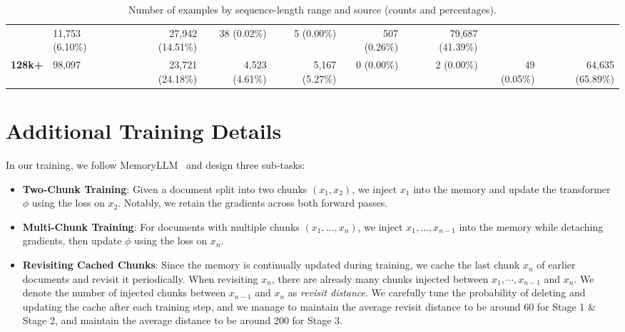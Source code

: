 \begin{table}[htbp]
{\begin{tabular}{llrrrrrrr}
                  & 11{,}753 (6.10\%) 
                  & 27{,}942 (14.51\%) 
                  & 38 (0.02\%) 
                  & 5 (0.00\%) 
                  & 507 (0.26\%) 
                  & 79{,}687 (41.39\%) \\
\textbf{128k+}    & 98{,}097 
                  & 23{,}721 (24.18\%) 
                  & 4{,}523 (4.61\%) 
                  & 5{,}167 (5.27\%) 
                  & 0 (0.00\%) 
                  & 2 (0.00\%) 
                  & 49 (0.05\%) 
                  & 64{,}635 (65.89\%) \\
\bottomrule
\end{tabular}}
\caption{Number of examples by sequence-length range and source (counts and percentages).}
\label{tab:sequence-ranges}
\end{table}


\section{Additional Training Details}
\label{sub:details_of_training_sub_tasks}
In our training, we follow MemoryLLM~\citep{memoryllm} and design three sub-tasks:
\begin{itemize}
    \item \textbf{Two-Chunk Training}: Given a document split into two chunks $(x_1, x_2)$, we inject $x_1$ into the memory and update the transformer $\phi$ using the loss on $x_2$. Notably, we retain the gradients across both forward passes. 
    \item \textbf{Multi-Chunk Training}: For documents with multiple chunks $(x_1, \dots, x_n)$, we inject $x_1, \dots, x_{n-1}$ into the memory while detaching gradients, then update $\phi$ using the loss on $x_n$.
    \item  \textbf{Revisiting Cached Chunks}: Since the memory is continually updated during training, we cache the last chunk $x_n$ of earlier documents and revisit it periodically. When revisiting $x_n$, there are already many chunks injected between $x_1, \cdots, x_{n-1}$ and $x_n$. We denote the number of injected chunks between $x_{n-1}$ and $x_n$ as \emph{revisit distance}. We carefully tune the probability of deleting and updating the cache after each training step, and we manage to maintain the average revisit distance to be around 60 for Stage 1 \& Stage 2, and maintain the average distance to be around 200 for Stage 3. 
\end{itemize}





